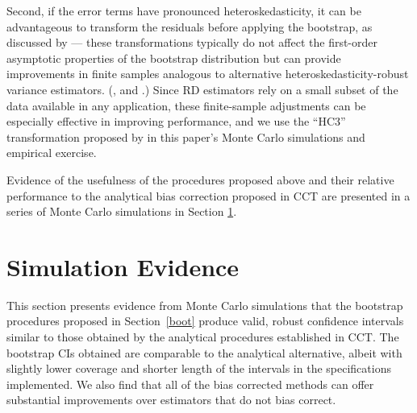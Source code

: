 \documentclass[12pt,fleqn]{article}
\begin{document}
Second, if the error terms have pronounced heteroskedasticity, it can be
advantageous to transform the residuals before applying the bootstrap, as
discussed by \citet{DF08} --- these transformations typically do not affect the
first-order asymptotic properties of the bootstrap distribution but can provide
improvements in finite samples analogous to alternative
heteroskedasticity-robust variance estimators. (\citealp{mackinnon1985some}, and
\citealp{mackinnon2013thirty}.) Since RD estimators rely on a small subset of
the data available in any application, these finite-sample adjustments can be
especially effective in improving performance, and we use the ``HC3''
transformation proposed by \citet{DF08} in this paper's Monte Carlo simulations
and empirical exercise.

Evidence of the usefulness of the procedures proposed above and their relative performance to the analytical bias correction proposed in CCT are presented in a series of Monte Carlo simulations in Section \ref{sim}.

\section{Simulation Evidence}\label{sim}
This section presents evidence from Monte Carlo simulations that the bootstrap
procedures proposed in Section~\ref{boot} produce valid, robust confidence
intervals similar to those obtained by the analytical procedures established
in CCT. The bootstrap CIs obtained are comparable to the analytical
alternative, albeit with slightly lower coverage and shorter
length of the intervals in the specifications implemented. We also find that
all of the bias corrected methods can offer substantial improvements over
estimators that do not bias correct.
\end{document}
